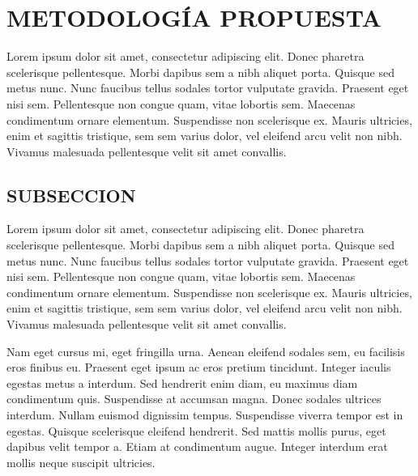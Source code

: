 
\chapter{METODOLOGÍA PROPUESTA}


Lorem ipsum dolor sit amet, consectetur adipiscing elit. Donec pharetra scelerisque pellentesque. Morbi dapibus sem a nibh aliquet porta. Quisque sed metus nunc. Nunc faucibus tellus sodales tortor vulputate gravida. Praesent eget nisi sem. Pellentesque non congue quam, vitae lobortis sem. Maecenas condimentum ornare elementum. Suspendisse non scelerisque ex. Mauris ultricies, enim et sagittis tristique, sem sem varius dolor, vel eleifend arcu velit non nibh. Vivamus malesuada pellentesque velit sit amet convallis.

\section{SUBSECCION}
Lorem ipsum dolor sit amet, consectetur adipiscing elit. Donec pharetra scelerisque pellentesque. Morbi dapibus sem a nibh aliquet porta. Quisque sed metus nunc. Nunc faucibus tellus sodales tortor vulputate gravida. Praesent eget nisi sem. Pellentesque non congue quam, vitae lobortis sem. Maecenas condimentum ornare elementum. Suspendisse non scelerisque ex. Mauris ultricies, enim et sagittis tristique, sem sem varius dolor, vel eleifend arcu velit non nibh. Vivamus malesuada pellentesque velit sit amet convallis.

Nam eget cursus mi, eget fringilla urna. Aenean eleifend sodales sem, eu facilisis eros finibus eu. Praesent eget ipsum ac eros pretium tincidunt. Integer iaculis egestas metus a interdum. Sed hendrerit enim diam, eu maximus diam condimentum quis. Suspendisse at accumsan magna. Donec sodales ultrices interdum. Nullam euismod dignissim tempus. Suspendisse viverra tempor est in egestas. Quisque scelerisque eleifend hendrerit. Sed mattis mollis purus, eget dapibus velit tempor a. Etiam at condimentum augue. Integer interdum erat mollis neque suscipit ultricies.

